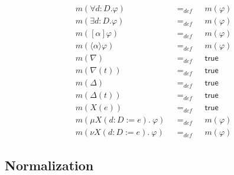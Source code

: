 \documentclass{article}
\begin{document}
\begin{equation*}
\begin{array}{lll}
m(\forall d{{:}D}.\varphi ) & =_{def} & m(\varphi ) \\ 
m(\exists d{{:}D}.\varphi ) & =_{def} & m(\varphi ) \\ 
m([\alpha ]\varphi ) & =_{def} & m(\varphi ) \\ 
m(\langle \alpha \rangle \varphi ) & =_{def} & m(\varphi ) \\ 
m(\nabla ) & =_{def} & \mathsf{true} \\ 
m(\nabla (t)) & =_{def} & \mathsf{true} \\ 
m(\Delta ) & =_{def} & \mathsf{true} \\ 
m(\Delta (t)) & =_{def} & \mathsf{true} \\ 
m(X(e)) & =_{def} & \mathsf{true} \\ 
m(\mu X(d{:}D:=e).~\varphi )~~~ & =_{def}~~~ & m(\varphi ) \\ 
m(\nu X(d{:}D:=e).~\varphi )~~~ & =_{def}~~~ & m(\varphi )%
\end{array}%
\end{equation*}

\newpage

\subsection{Normalization}
\end{document}

